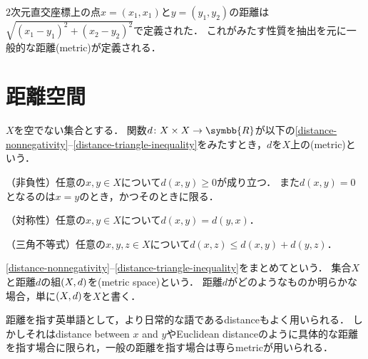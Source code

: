 \documentclass{ltjsbook}
\begin{document}
\nocite{uchida}
\nocite{introduction-to-topology}


\(2\)次元直交座標上の点\(x = (x_1, x_1)\)と\(y = (y_1, y_2)\)の距離は\(\sqrt{(x_1 - y_1)^2 + (x_2 - y_2)^2}\)で定義された．
これがみたす性質を抽出を元に一般的な距離(metric)が定義される．

\section{距離空間}
\begin{thmbox}
\begin{definition}
\(X\)を空でない集合とする．
    関数\(d\colon X \times X \to \symbb{R}\)が以下の\ref{distance-nonnegativity}--\ref{distance-triangle-inequality}をみたすとき，\(d\)を\(X\)上の(metric)という．
\begin{conditions}
    \item\label{distance-nonnegativity} （非負性）任意の\(x, y \in X\)について\(d(x, y) \geq 0\)が成り立つ．
        また\(d(x, y) = 0\)となるのは\(x = y\)のとき，かつそのときに限る．
    \item\label{distance-symmetry} （対称性）任意の\(x, y \in X\)について\(d(x, y) = d(y, x)\)．
    \item\label{distance-triangle-inequality} （三角不等式）任意の\(x, y, z \in X\)について\(d(x, z) \leq d(x, y) + d(y, z)\)．
\end{conditions}
\ref{distance-nonnegativity}--\ref{distance-triangle-inequality}をまとめてという．
集合\(X\)と距離\(d\)の組\((X, d)\)を(metric space)という．
距離\(d\)がどのようなものか明らかな場合，単に\((X, d)\)を\(X\)と書く．
\end{definition}
\end{thmbox}

距離を指す英単語として，より日常的な語であるdistanceもよく用いられる．
しかしそれはdistance between \(x\) and \(y\)やEuclidean distanceのように具体的な距離を指す場合に限られ，一般の距離を指す場合は専らmetricが用いられる．
\end{document}

